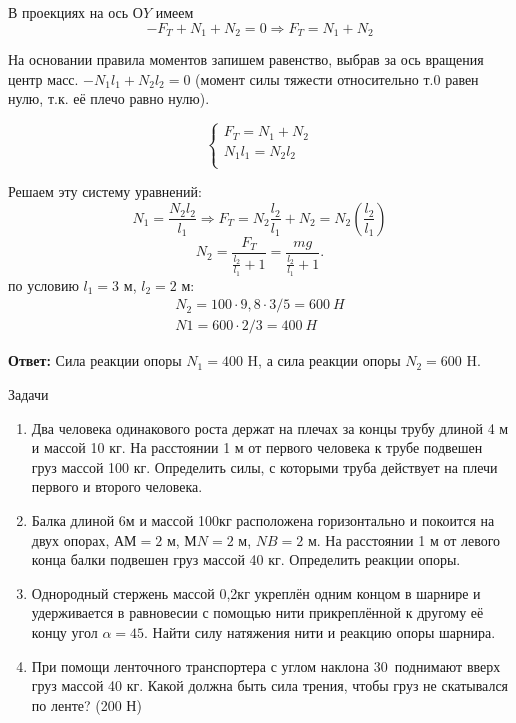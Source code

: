 \documentclass[a5paper, 10pt]{diss_4}
\renewcommand{\'}{\,'}
\begin{document}
В проекциях на ось $ОY$ имеем
\[
-F_T+N_1+N_2=0\Rightarrow
F_T=N_1+N_2
\]

На основании правила моментов запишем равенство, выбрав за ось вращения центр масс. $-N_1l_1+N_2l_2=0$ (момент силы тяжести относительно т.$0$ равен нулю, т.к. её плечо равно нулю).

\begin{equation*}
     \left\{
          \begin{array}{lr}
 F_T=N_1+N_2\\
 N_1l_1=N_2l_2\\
          \end{array}
     \right.
\end{equation*}

Решаем эту систему уравнений:
\[
N_1=\frac{N_2l_2}{l_1}\Rightarrow F_T=N_2\frac{l_2}{l_1}+N_2=N_2\left(\frac{l_2}{l_1}\right)
\]
\[
N_2=\frac{F_T}{\frac{l_2}{l_1}+1}=\frac{mg}{\frac{l_2}{l_1}+1}.
\]
по условию $l_1=3$ м, $l_2=2$ м:
\begin{gather*}
N_2=100\cdot9,8\cdot3/5=600\ H\\
N1=600\cdot2/3=400\ H
\end{gather*}


\textbf{Ответ:} Сила реакции опоры $N_1=400$ H, а сила реакции опоры $N_2=600$ H.

\begin{center}
   Задачи
\end{center}
\begin{enumerate}

\item Два человека одинакового роста держат на плечах за концы трубу длиной 4 м и массой 10 кг. На расстоянии 1 м от первого человека к трубе подвешен груз массой 100 кг. Определить силы, с которыми труба действует на плечи первого и второго человека.

\item Балка длиной 6м и массой 100кг расположена горизонтально и покоится на двух опорах, $АМ=2$ м, $МN=2$ м, $NB=2$ м. На расстоянии 1 м от левого конца балки подвешен груз массой 40 кг. Определить реакции опоры.

\item Однородный стержень массой 0,2кг укреплён одним концом в шарнире и удерживается в равновесии с помощью нити прикреплённой к другому её концу угол $\alpha=45$\textdegree. Найти силу натяжения нити и реакцию опоры шарнира.

\item При помощи ленточного транспортера с углом наклона 30\textdegree\ поднимают вверх груз массой 40 кг. Какой должна быть сила трения, чтобы груз не скатывался по ленте? (200 Н)

\end{enumerate}
\end{document}
